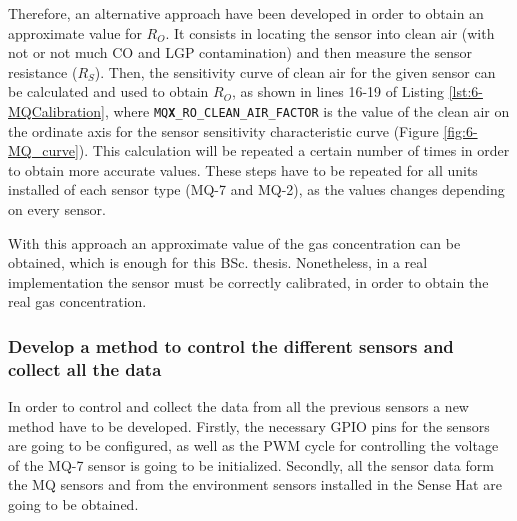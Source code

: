 Therefore, an alternative approach have been developed in order to obtain an approximate value for ${R}_{O}$. It consists in locating the sensor into clean air (with not or not much CO and LGP contamination) and then measure the sensor resistance (${R}_{S}$). Then, the sensitivity curve of clean air for the given sensor can be calculated and used to obtain ${R}_{O}$, as shown in lines 16-19 of Listing \ref{lst:6-MQCalibration}, where \texttt{MQ\textbf{X}\_RO\_CLEAN\_AIR\_FACTOR} is the value of the clean air on the ordinate axis for the sensor sensitivity characteristic curve (Figure \ref{fig:6-MQ_curve}). This calculation will be repeated a certain number of times in order to obtain more accurate values. These steps have to be repeated for all units installed of each sensor type (MQ-7 and MQ-2), as the values changes depending on every sensor.



With this approach an approximate value of the gas concentration can be obtained, which is enough for this \ac{BSc.} thesis. Nonetheless, in a real implementation the sensor must be correctly calibrated, in order to obtain the real gas concentration.


\subsubsection{Develop a method to control the different sensors and collect all the data}

In order to control and collect the data from all the previous sensors a new method have to be developed. Firstly, the necessary GPIO pins for the sensors are going to be configured, as well as the \ac{PWM} cycle for controlling the voltage of the MQ-7 sensor is going to be initialized. Secondly, all the sensor data form the MQ sensors and from the environment sensors installed in the Sense Hat \cite{SenseHAT} are going to be obtained.


